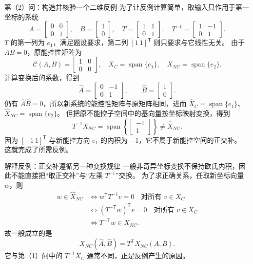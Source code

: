 \documentclass[11pt]{article}
\begin{document}
\begin{solution}
\begin{proofstep}{第（2）问：构造并核验一个二维反例}
为了让反例计算简单，取输入只作用于第一坐标的系统
\[
A=\begin{bmatrix}0&0\\0&1\end{bmatrix},\quad
B=\begin{bmatrix}1\\0\end{bmatrix},\quad
T=\begin{bmatrix}1&1\\0&1\end{bmatrix},\quad
T^{-1}=\begin{bmatrix}1&-1\\0&1\end{bmatrix}.
\]
$T$ 的第一列为 $e_1$，满足题设要求，第二列 $[1\ 1]^{\mathsf T}$ 则只要求与它线性无关。
由于 $AB=0$，原能控性矩阵为
\[
\mathcal C(A,B)=\begin{bmatrix}1&0\\0&0\end{bmatrix},
\quad X_C=\operatorname{span}\{e_1\},\quad X_{NC}=\operatorname{span}\{e_2\}.
\]
计算变换后的系数，得到
\[
\widehat A=\begin{bmatrix}0&-1\\0&1\end{bmatrix},\qquad
\widehat B=\begin{bmatrix}1\\0\end{bmatrix}.
\]
仍有 $\widehat A\widehat B=0$，所以新系统的能控性矩阵与原矩阵相同，进而
$\widehat X_C=\operatorname{span}\{e_1\}$、$\widehat X_{NC}=\operatorname{span}\{e_2\}$。
但把原不能控子空间中的基向量按坐标映射变换，得到
\[
T^{-1}X_{NC}=\operatorname{span}\left\{\begin{bmatrix}-1\\1\end{bmatrix}\right\}
\ne\widehat X_{NC}.
\]
因为 $[-1\ 1]^{\mathsf T}$ 与新能控方向 $e_1$ 的内积为 $-1$，它不属于新能控空间的正交补。
这就完成了所需反例。
\end{proofstep}

\begin{proofstep}{解释反例：正交补遵循另一种变换规律}
一般非奇异坐标变换不保持欧氏内积，因此不能直接把“取正交补”与“左乘 $T^{-1}$”交换。
为了求正确关系，任取新坐标向量 $w$，则
\begin{align*}
w\in\widehat X_{NC}
&\iff w^{\mathsf T}T^{-1}v=0\quad\text{对所有 }v\in X_C\\
&\iff (T^{-\mathsf T}w)^{\mathsf T}v=0\quad\text{对所有 }v\in X_C\\
&\iff T^{-\mathsf T}w\in X_{NC}.
\end{align*}
故一般成立的是
\[
\boxed{X_{NC}(\widehat A,\widehat B)=T^{\mathsf T}X_{NC}(A,B).}
\]
它与第（1）问中的 $T^{-1}X_C$ 通常不同，正是反例产生的原因。
\end{proofstep}


\end{solution}
\end{document}
